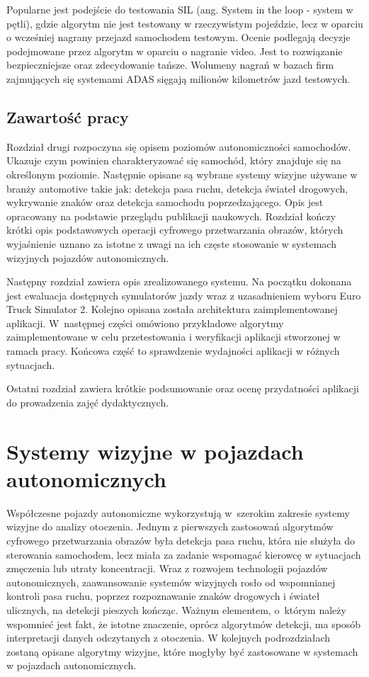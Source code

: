 Popularne jest podejście do testowania SIL (ang. System in the loop - system w pętli), gdzie algorytm nie jest testowany w rzeczywistym pojeździe, lecz w oparciu o wcześniej nagrany przejazd samochodem testowym. Ocenie podlegają decyzje podejmowane przez algorytm w oparciu o nagranie video. Jest to rozwiązanie bezpieczniejsze oraz zdecydowanie tańsze. Wolumeny nagrań w bazach firm zajmujących się systemami ADAS sięgają milionów kilometrów jazd testowych.

\section{Zawartość pracy}

Rozdział drugi rozpoczyna się opisem poziomów autonomiczności samochodów. 
Ukazuje czym powinien charakteryzować się samochód, który znajduje się na określonym poziomie.
Następnie opisane są wybrane systemy wizyjne używane w branży automotive takie jak: detekcja pasa ruchu, detekcja świateł drogowych, wykrywanie znaków oraz detekcja samochodu poprzedzającego.
Opis jest opracowany na podstawie przeglądu publikacji naukowych.
Rozdział kończy krótki opis podstawowych operacji cyfrowego przetwarzania obrazów, których wyjaśnienie uznano za istotne z uwagi na ich częste stosowanie w systemach wizyjnych pojazdów autonomicznych.

Następny rozdział zawiera opis zrealizowanego systemu. 
Na początku dokonana jest ewaluacja dostępnych symulatorów jazdy wraz z uzasadnieniem wyboru Euro Truck Simulator 2. 
Kolejno opisana została architektura zaimplementowanej aplikacji. 
W~następnej części omówiono przykładowe algorytmy zaimplementowane w celu przetestowania i weryfikacji aplikacji stworzonej w ramach pracy. 
Końcowa część to sprawdzenie wydajności aplikacji w różnych sytuacjach.

Ostatni rozdział zawiera krótkie podsumowanie oraz ocenę przydatności aplikacji do prowadzenia zajęć dydaktycznych.

\chapter{Systemy wizyjne w pojazdach autonomicznych}

Współczesne pojazdy autonomiczne wykorzystują w~szerokim zakresie systemy wizyjne do analizy otoczenia. 
Jednym z pierwszych zastosowań algorytmów cyfrowego przetwarzania obrazów była detekcja pasa ruchu, która nie służyła do sterowania samochodem, lecz miała za zadanie wspomagać kierowcę w sytuacjach zmęczenia lub utraty koncentracji. 
Wraz z rozwojem technologii pojazdów autonomicznych, zaawansowanie systemów wizyjnych rosło od wspomnianej kontroli pasa ruchu, poprzez rozpoznawanie znaków drogowych i świateł ulicznych, na detekcji pieszych kończąc.
Ważnym elementem, o~którym należy wspomnieć jest fakt, że istotne znaczenie, oprócz algorytmów detekcji, ma sposób interpretacji danych odczytanych z otoczenia. %
W kolejnych podrozdziałach zostaną opisane algorytmy wizyjne, które mogłyby być zastosowane w systemach w pojazdach autonomicznych. 

